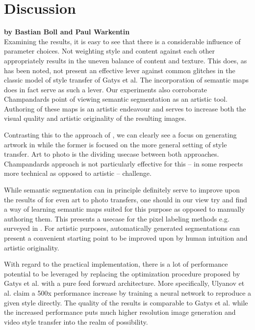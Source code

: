 
\clearpage
\section{Discussion}
\label{section:discussion}

\textbf{by Bastian Boll and Paul Warkentin} \\

Examining the results, it is easy to see that there is a considerable influence of parameter choices. Not weighting style and content against each other appropriately results in the uneven balance of content and texture. This does, as has been noted, not present an effective lever against common glitches in the classic model of style transfer of Gatys et al. The incorporation of semantic maps does in fact serve as such a lever. Our experiments also corroborate Champandards point of viewing semantic segmentation as an artistic tool. Authoring of these maps is an artistic endeavour and serves to increase both the visual quality and artistic originality of the resulting images. 

Contrasting this to the approach of \cite{mrf2016}, we can clearly see a focus on generating artwork in \cite{doodles2016} while the former is focused on the more general setting of style transfer. Art to photo is the dividing usecase between both approaches. Champandards approach is not particularly effective for this -- in some respects more technical as opposed to artistic -- challenge. 

While semantic segmentation can in principle definitely serve to improve upon the results of \cite{mrf2016} for even art to photo transfers, one should in our view try and find a way of learning semantic maps suited for this purpose as opposed to manually authoring them. This presents a usecase for the pixel labeling methods e.g. surveyed in \cite{thoma2016survey}. For artistic purposes, automatically generated segmentations can present a convenient starting point to be improved upon by human intuition and artistic originality.

With regard to the practical implementation, there is a lot of performance potential to be leveraged by replacing the optimization procedure proposed by Gatys et al. with a pure feed forward architecture. More specifically, Ulyanov et al. \cite{ulyanov2016texture} claim a 500x performance increase by training a neural network to reproduce a given style directly. The quality of the results is comparable to Gatys et al. while the increased performance puts much higher resolution image generation and video style transfer into the realm of possibility. 

